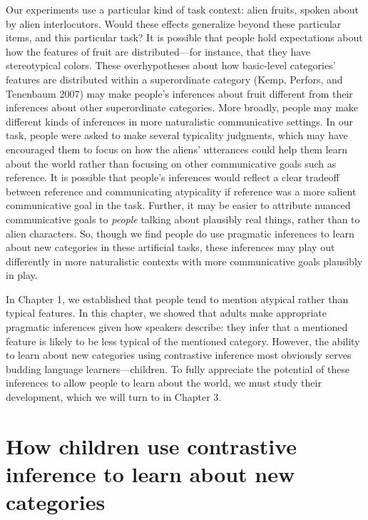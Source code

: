 \documentclass{ucetd}
\begin{document}
Our experiments use a particular kind of task context: alien fruits,
spoken about by alien interlocutors. Would these effects generalize
beyond these particular items, and this particular task? It is possible
that people hold expectations about how the features of fruit are
distributed---for instance, that they have stereotypical colors. These
overhypotheses about how basic-level categories' features are
distributed within a superordinate category (Kemp, Perfors, and
Tenenbaum 2007) may make people's inferences about fruit different from
their inferences about other superordinate categories. More broadly,
people may make different kinds of inferences in more naturalistic
communicative settings. In our task, people were asked to make several
typicality judgments, which may have encouraged them to focus on how the
aliens' utterances could help them learn about the world rather than
focusing on other communicative goals such as reference. It is possible
that people's inferences would reflect a clear tradeoff between
reference and communicating atypicality if reference was a more salient
communicative goal in the task. Further, it may be easier to attribute
nuanced communicative goals to \emph{people} talking about plausibly
real things, rather than to alien characters. So, though we find people
do use pragmatic inferences to learn about new categories in these
artificial tasks, these inferences may play out differently in more
naturalistic contexts with more communicative goals plausibly in play.

In Chapter 1, we established that people tend to mention atypical rather
than typical features. In this chapter, we showed that adults make
appropriate pragmatic inferences given how speakers describe: they infer
that a mentioned feature is likely to be less typical of the mentioned
category. However, the ability to learn about new categories using
contrastive inference most obviously serves budding language
learners---children. To fully appreciate the potential of these
inferences to allow people to learn about the world, we must study their
development, which we will turn to in Chapter 3.

\hypertarget{how-children-use-contrastive-inference-to-learn-about-new-categories}{%
\chapter{How children use contrastive inference to learn about new
categories}\label{how-children-use-contrastive-inference-to-learn-about-new-categories}}
\end{document}
